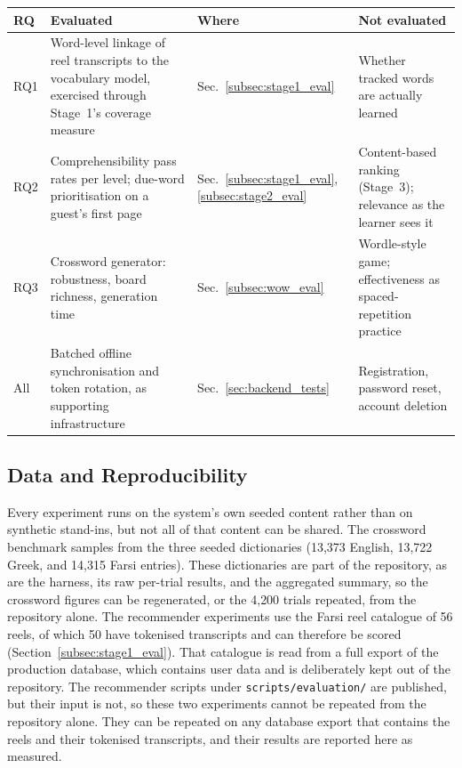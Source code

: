     \begin{center}
        \begin{minipage}{\linewidth}%
        \small
        \label{tab:eval_rq_mapping}
        \begin{tabular}{L{1.2cm}L{4.4cm}L{3.6cm}L{3.9cm}}
            \hline
            \textbf{RQ} & \textbf{Evaluated} & \textbf{Where} & \textbf{Not evaluated} \\
            \hline
            RQ1 & Word-level linkage of reel transcripts to the vocabulary model, exercised through Stage~1's coverage measure & Sec.~\ref{subsec:stage1_eval} & Whether tracked words are actually learned \\
            \hline
            RQ2 & Comprehensibility pass rates per level; due-word prioritisation on a guest's first page & Sec.~\ref{subsec:stage1_eval}, \ref{subsec:stage2_eval} & Content-based ranking (Stage~3); relevance as the learner sees it \\
            \hline
            RQ3 & Crossword generator: robustness, board richness, generation time & Sec.~\ref{subsec:wow_eval} & Wordle-style game; effectiveness as spaced-repetition practice \\
            \hline
            All & Batched offline synchronisation and token rotation, as supporting infrastructure & Sec.~\ref{sec:backend_tests} & Registration, password reset, account deletion \\
            \hline
        \end{tabular}
        \end{minipage}
    \end{center}

    \subsection{Data and Reproducibility}
    \label{subsec:eval_data}
    Every experiment runs on the system's own seeded content rather than on synthetic stand-ins, but not all of that content can be shared. The crossword benchmark samples from the three seeded dictionaries (13,373 English, 13,722 Greek, and 14,315 Farsi entries). These dictionaries are part of the repository, as are the harness, its raw per-trial results, and the aggregated summary, so the crossword figures can be regenerated, or the 4{,}200 trials repeated, from the repository alone. The recommender experiments use the Farsi reel catalogue of 56 reels, of which 50 have tokenised transcripts and can therefore be scored (Section~\ref{subsec:stage1_eval}). That catalogue is read from a full export of the production database, which contains user data and is deliberately kept out of the repository. The recommender scripts under \texttt{scripts/evaluation/} are published, but their input is not, so these two experiments cannot be repeated from the repository alone. They can be repeated on any database export that contains the reels and their tokenised transcripts, and their results are reported here as measured.

